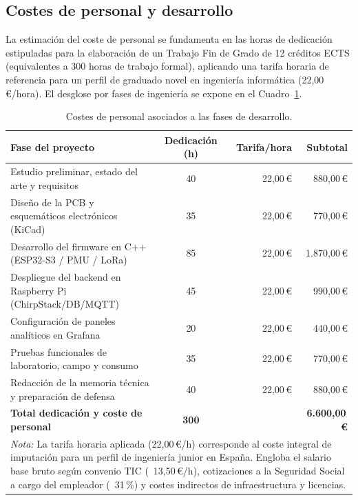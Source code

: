 \subsection{Costes de personal y desarrollo}
La estimación del coste de personal se fundamenta en las horas de dedicación estipuladas para la elaboración de un Trabajo Fin de Grado de 12 créditos ECTS (equivalentes a 300 horas de trabajo formal), aplicando una tarifa horaria de referencia para un perfil de graduado novel en ingeniería informática (22,00\,€/hora). El desglose por fases de ingeniería se expone en el Cuadro~\ref{tab:costes_personal}.

\begin{table}[htbp]
\centering
\small
\begin{tabular}{p{7.5cm} c r r}
\hline
\textbf{Fase del proyecto} & \textbf{Dedicación (h)} & \textbf{Tarifa/hora} & \textbf{Subtotal} \\ \hline
Estudio preliminar, estado del arte y requisitos & 40 & 22,00\,€ & 880,00\,€ \\
Diseño de la PCB y esquemáticos electrónicos (KiCad) & 35 & 22,00\,€ & 770,00\,€ \\
Desarrollo del firmware en C++ (ESP32-S3 / PMU / LoRa) & 85 & 22,00\,€ & 1.870,00\,€ \\
Despliegue del backend en Raspberry Pi (ChirpStack/DB/MQTT) & 45 & 22,00\,€ & 990,00\,€ \\
Configuración de paneles analíticos en Grafana & 20 & 22,00\,€ & 440,00\,€ \\
Pruebas funcionales de laboratorio, campo y consumo & 35 & 22,00\,€ & 770,00\,€ \\
Redacción de la memoria técnica y preparación de defensa & 40 & 22,00\,€ & 880,00\,€ \\ \hline
\textbf{Total dedicación y coste de personal} & \textbf{300} & & \textbf{6.600,00\,€} \\ \hline
\multicolumn{4}{p{13.5cm}}{\footnotesize \textit{Nota:} La tarifa horaria aplicada (22,00\,€/h) corresponde al coste integral de imputación para un perfil de ingeniería junior en España. Engloba el salario base bruto según convenio TIC (~13,50\,€/h), cotizaciones a la Seguridad Social a cargo del empleador (~31\,\%) y costes indirectos de infraestructura y licencias.}
\end{tabular}
\caption{Costes de personal asociados a las fases de desarrollo.}
\label{tab:costes_personal}
\end{table}

